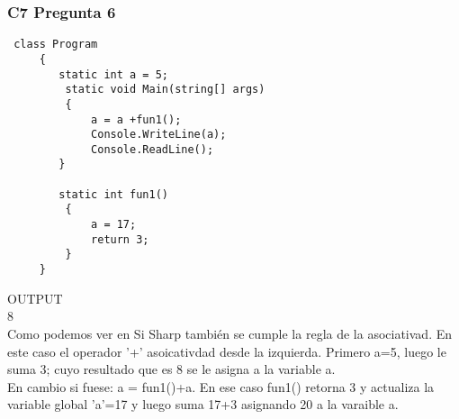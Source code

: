 \subsubsection{C7 Pregunta 6}
\begin{lstlisting}
 class Program
     {
        static int a = 5;
         static void Main(string[] args)
         {
             a = a +fun1();
             Console.WriteLine(a);
             Console.ReadLine();
        }
 
        static int fun1()
         {
             a = 17;
             return 3;
         }
     }
 \end{lstlisting}
 OUTPUT\\
 8\\ 
Como podemos ver en Si Sharp también se cumple la regla de la asociativad. En este caso el operador '+' asoicativdad desde la izquierda. Primero a=5, luego le suma 3; cuyo resultado que es 8 se le asigna a la variable a.\\
En cambio si fuese:  a = fun1()+a. En ese caso fun1() retorna 3 y actualiza la variable global 'a'=17 y luego suma 17+3 asignando 20 a la varaible a.
  